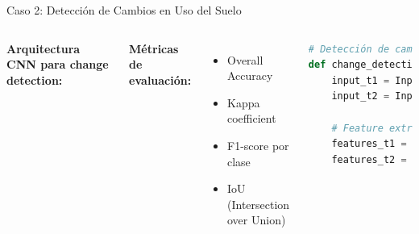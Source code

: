 \documentclass[10pt,aspectratio=169]{beamer}
\begin{document}
\begin{frame}{Caso 2: Detección de Cambios en Uso del Suelo}
    \begin{columns}
        \textbf{Arquitectura CNN para change detection:}

        \vspace{2mm}

        \vspace{3mm}
        \textbf{Métricas de evaluación:}
        \begin{itemize}
            \item Overall Accuracy
            \item Kappa coefficient
            \item F1-score por clase
            \item IoU (Intersection over Union)
        \end{itemize}

        \begin{lstlisting}[language=Python,basicstyle=\tiny]
# Detección de cambios
def change_detection_model():
    input_t1 = Input((256, 256, 4))
    input_t2 = Input((256, 256, 4))

    # Feature extraction
    features_t1 = vgg16_encoder(input_t1)
    features_t2 = vgg16_encoder(input_t2)


\end{lstlisting}
\end{columns}
\end{frame}
\end{document}

